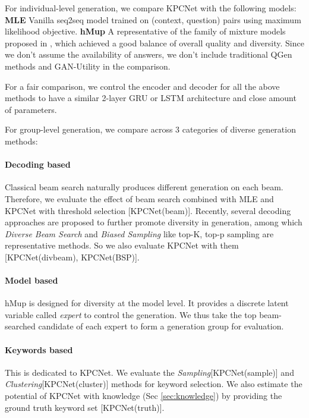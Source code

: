 \documentclass[letterpaper]{article} %
\begin{document}
For individual-level generation, we compare KPCNet with the following models: \textbf{MLE} Vanilla seq2seq model trained on (context, question) pairs using maximum likelihood objective.  \textbf{hMup} A representative of the family of mixture models proposed in \citet{shen2019mixture}, which achieved a good balance of overall quality and diversity. Since we don't assume the availability of answers, we don't include traditional QGen methods and GAN-Utility \citep{rao2019answer} in the comparison.

For a fair comparison, we control the encoder and decoder for all the above methods to have a similar 2-layer GRU \citep{cho2014learning} or LSTM \citep{hochreiter1997long} architecture and close amount of parameters. 

For group-level generation, we compare across 3 categories of diverse generation methods:

\paragraph{Decoding based} Classical beam search naturally produces different generation on each beam. Therefore, we evaluate the effect of beam search combined with MLE and KPCNet with threshold selection [KPCNet(beam)]. Recently, several decoding approaches \citep{ippolito2019comparison} are proposed to further promote diversity in generation, among which \textit{Diverse Beam Search}\citep{vijayakumar2018diverse} and \textit{Biased Sampling} like top-K, top-p sampling \citep{fan-etal-2018-hierarchical, holtzman2019curious} are representative methods. So we also evaluate KPCNet with them [KPCNet(divbeam), KPCNet(BSP)].

\paragraph{Model based} hMup is designed for diversity at the model level. It provides a discrete latent variable called \textit{expert} to control the generation. We thus take the top beam-searched candidate of each expert to form a generation group for evaluation.

\paragraph{Keywords based} This is dedicated to KPCNet. We evaluate the \textit{Sampling}[KPCNet(sample)] and \textit{Clustering}[KPCNet(cluster)] methods for keyword selection. We also estimate the potential of KPCNet with knowledge (Sec \ref{sec:knowledge}) by providing the ground truth keyword set [KPCNet(truth)].
\end{document}
